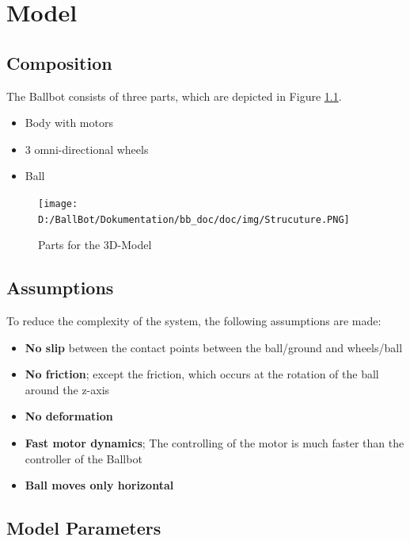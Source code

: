 \documentclass[twoside,colorback,accentcolor=tud4c,11pt]{tudreport}
\begin{document}
	\chapter{Model}
	
	\section{Composition}
	The Ballbot consists of three parts, which are depicted in Figure \ref{fig:Structure}.
	
	\begin{itemize}
		\item Body with motors
		\item 3 omni-directional wheels
		\item Ball
	\end{itemize}
	
	
	\begin{figure}[htbp]
		\centering
			\texttt{[image: D:/BallBot/Dokumentation/bb\_doc/doc/img/Strucuture.PNG]}
		\caption{Parts for the 3D-Model}
		\label{fig:Structure}
	\end{figure}
	
	\section{Assumptions}
	
	To reduce the complexity of the system, the following assumptions are made: 
	
	\begin{itemize}
		\item \textbf{No slip} between the contact points between the ball/ground and wheels/ball
		\item \textbf{No friction}; except the friction, which occurs at the rotation of the ball around the z-axis
		\item \textbf{No deformation}
		\item \textbf{Fast motor dynamics}; The controlling of the motor is much faster than the controller of the Ballbot
		\item \textbf{Ball moves only horizontal}
	\end{itemize}
	
	\section{Model Parameters}
	
\end{document}
